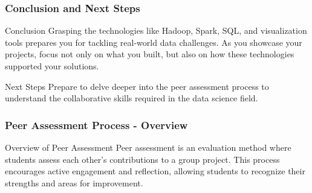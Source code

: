 \documentclass{beamer}
\begin{document}
\begin{frame}[fragile]
    \frametitle{Conclusion and Next Steps}
    \begin{block}{Conclusion}
        Grasping the technologies like Hadoop, Spark, SQL, and visualization tools prepares you for tackling real-world data challenges. 
        As you showcase your projects, focus not only on what you built, but also on how these technologies supported your solutions.
    \end{block}
    \begin{block}{Next Steps}
        Prepare to delve deeper into the peer assessment process to understand the collaborative skills required in the data science field.
    \end{block}
\end{frame}

\begin{frame}[fragile]
    \frametitle{Peer Assessment Process - Overview}
    \begin{block}{Overview of Peer Assessment}
        Peer assessment is an evaluation method where students assess each other's contributions to a group project. This process encourages active engagement and reflection, allowing students to recognize their strengths and areas for improvement.
    \end{block}
\end{frame}
\end{document}
